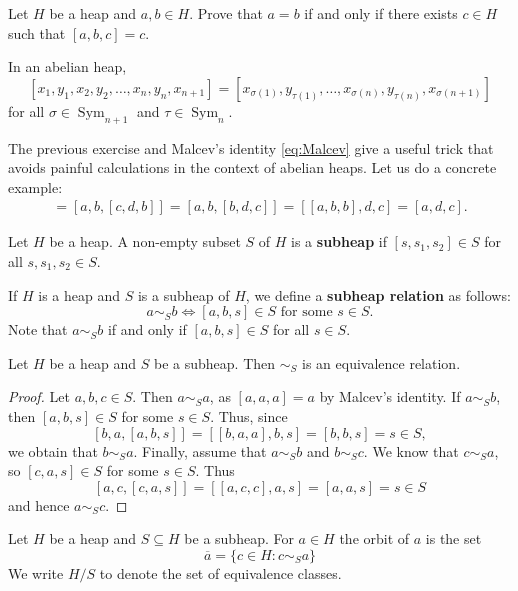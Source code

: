 \documentclass[graybox]{svmult}
\newcommand{\Sym}{\operatorname{Sym}}
\begin{document}
\begin{exercise}
\label{xca:equality}
    Let $H$ be a heap and $a,b\in H$. Prove that
    $a=b$ if and only if there exists $c\in H$ such that 
    $[a,b,c]=c$.
\end{exercise}

\begin{exercise}
    In an abelian heap,
    \[
    [x_1,y_1,x_2,y_2,\dots,x_n,y_n,x_{n+1}]=[x_{\sigma(1)},y_{\tau(1)},\dots,x_{\sigma(n)},y_{\tau(n)},x_{\sigma(n+1)}]
    \]
    for all $\sigma\in\Sym_{n+1}$ and $\tau\in\Sym_n$. 
\end{exercise}

The previous exercise and Malcev's identity \eqref{eq:Malcev}
give a useful trick that avoids painful calculations in the context of abelian heaps. 
Let us do a concrete example:
\begin{align*}
    [a,b,c,d,b]=[a,b,[c,d,b]]=[a,b,[b,d,c]]=[[a,b,b],d,c]=[a,d,c].
\end{align*}

\begin{definition}
    Let $H$ be a heap. 
    A non-empty subset $S$ of $H$ is a \textbf{subheap} if $[s,s_1,s_2]\in S$ for all 
    $s,s_1,s_2\in S$. 
\end{definition}

If $H$ is a heap and $S$ is a subheap of $H$, we define 
a \textbf{subheap relation} as follows:
\[
a\sim_S b\Longleftrightarrow [a,b,s]\in S\text{ for some $s\in S$}.
\]
Note that $a\sim_Sb$ if and only if $[a,b,s]\in S$ for all $s\in S$. 

\begin{proposition}
    Let $H$ be a heap and $S$ be a subheap. Then $\sim_S$ is an equivalence relation. 
\end{proposition}

\begin{proof}
    Let $a,b,c\in S$. Then $a\sim_S a$, as $[a,a,a]=a$ by Malcev's identity. 
    If $a\sim_S b$, then $[a,b,s]\in S$ for some $s\in S$. Thus, since 
    \[
    [b,a,[a,b,s]]=[[b,a,a],b,s]=[b,b,s]=s\in S,
    \]
    we obtain that $b\sim_S a$. 
    Finally, assume that $a\sim_S b$ and $b\sim_S c$. We know that 
    $c\sim_S a$, so 
    $[c,a,s]\in S$ for some $s\in S$. Thus 
    \[
    [a,c,[c,a,s]]=[[a,c,c],a,s]=[a,a,s]=s\in S
    \]
    and hence $a\sim_S c$. 
\end{proof}

Let $H$ be a heap and $S\subseteq H$ be a subheap. For $a\in H$ 
the orbit of $a$ is the set
\[
\overline{a}=\{c\in H:c\sim_S a\}
\]
We write $H/S$ to denote the set
of equivalence classes.
\end{document}
